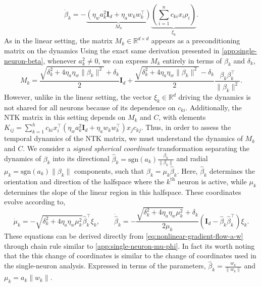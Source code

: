 \documentclass{article}
\theoremstyle{plain}
\theoremstyle{definition}
\theoremstyle{remark}
\begin{document}
\begin{equation}
    \label{eq:nonlinear-gradient-flow-beta}
    \dot{\beta}_k = -\underbrace{\left(\eta_wa_k^2\mathbf{I}_d + \eta_aw_kw_k^\intercal\right)}_{M_k}\underbrace{\left(\textstyle\sum_{i=1}^nc_{ki}x_i\rho_i\right)}_{\xi_k}.
\end{equation}
As in the linear setting, the matrix $M_k \in \mathbb{R}^{d \times d}$ appears as a preconditioning matrix on the dynamics
%
Using the exact same derivation presented in \cref{app:single-neuron-beta}, whenever $a_k^2 \neq 0$, we can express $M_k$ entirely in terms of $\beta_k$ and $\delta_k$,
\begin{equation}
    M_k = \frac{\sqrt{\delta_k^2 + 4\eta_a\eta_w\|\beta_k\|^2} + \delta_k}{2}\mathbf{I}_d + \frac{\sqrt{\delta_k^2 + 4\eta_a\eta_w\|\beta_k\|^2} - \delta_k}{2}\frac{\beta_k\beta_k^\intercal}{\|\beta_k\|^2}.
\end{equation}
However, unlike in the linear setting, the vector $\xi_k \in \mathbb{R}^d$ driving the dynamics is not shared for all neurons because of its dependence on $c_{ki}$.
%
Additionally, the NTK matrix in this setting depends on $M_k$ and $C$, with elements $K_{ij} = \sum_{k = 1}^h c_{ki} x_i^\intercal \left(\eta_wa_k^2\mathbf{I}_d + \eta_aw_kw_k^\intercal\right) x_j c_{kj}$.
%
Thus, in order to assess the temporal dynamics of the NTK matrix, we must understand the dynamics of $M_k$ and $C$.
%
We consider a \emph{signed spherical coordinate} transformation separating the dynamics of $\beta_k$ into its directional $\hat{\beta}_k = \mathrm{sgn}(a_k)\tfrac{\beta_k}{\|\beta_k\|}$ and radial $\mu_k = \mathrm{sgn}(a_k)\|\beta_k\|$ components, such that $\beta_k = \mu_k \hat{\beta}_k$.
%
Here, $\hat{\beta}_k$ determines the orientation and direction of the halfspace where the $k^{\mathrm{th}}$ neuron is active, while $\mu_k$ determines the slope of the linear region in this halfspace.
%
These coordinates evolve according to,
%
\begin{equation}
    \dot{\mu}_k = -\sqrt{\delta_k^2 + 4\eta_a\eta_w\mu_k^2}\hat{\beta}_k^\intercal \xi_k, \qquad
    \dot{\hat{\beta}}_k = -\frac{\sqrt{\delta_k^2 + 4\eta_a\eta_w\mu_k^2} + \delta_k}{2\mu_k} \left(\mathbf{I}_d - \hat{\beta}_k\hat{\beta}_k^\intercal\right)\xi_k.
\end{equation}
%
These equations can be derived directly from \cref{eq:nonlinear-gradient-flow-a-w} through chain rule similar to \cref{app:single-neuron-mu-phi}.
%
In fact its worth noting that the this change of coordinates is similar to the change of coordinates used in the single-neuron analysis.
%
Expressed in terms of the parameters, $\hat{\beta}_k = \frac{w_k}{\|w_k\|}$ and $\mu_k = a_k \|w_k\|$.
\end{document}
